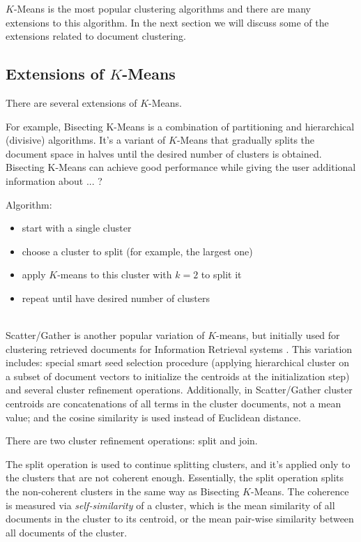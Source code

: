 $K$-Means is the most popular clustering algorithms and there are 
many extensions to this algorithm. In the next section we will
discuss some of the extensions related to document clustering. 


\subsection{Extensions of $K$-Means} \label{sec:kmeans-ext}

There are several extensions of $K$-Means. 


For example, Bisecting K-Means \cite{steinbach2000comparison} is a combination 
of partitioning and hierarchical (divisive) algorithms. It's a variant of $K$-Means that 
gradually splits the document space in halves until the desired number of clusters 
is obtained. Bisecting K-Means can achieve good performance while 
giving the user additional information about ... ?

Algorithm:

\begin{itemize}
  \item start with a single cluster
  \item choose a cluster to split (for example, the largest one)
  \item apply $K$-means to this cluster with $k=2$ to split it
  \item repeat until have desired number of clusters
\end{itemize}


\ \\

Scatter/Gather is another popular variation of $K$-means, but 
initially used for clustering retrieved documents for Information 
Retrieval systems \cite{cutting1992scatter}. This variation
includes: special smart seed selection procedure (applying 
hierarchical cluster on a subset of document vectors to
initialize the centroids at the initialization step) and
several cluster refinement operations. 
Additionally, in Scatter/Gather cluster centroids are concatenations 
of all terms in the cluster documents, not a mean value;
and the cosine similarity is used instead of Euclidean 
distance. 


There are two cluster refinement operations: split and join.

The split operation is used to continue splitting clusters,
and it's applied only to the clusters that are not coherent 
enough. Essentially, the split operation splits the non-coherent
clusters in the same way as Bisecting $K$-Means. 
The coherence is measured via \emph{self-similarity} of a cluster,
which is the mean similarity of all documents in the cluster to 
its centroid, or the mean pair-wise similarity between all documents 
of the cluster. 


